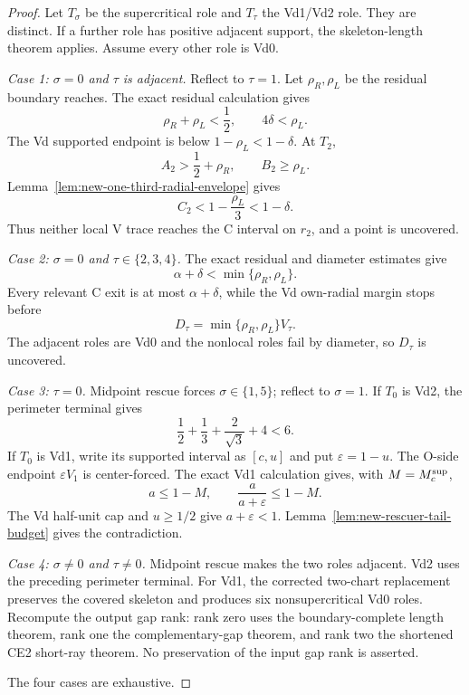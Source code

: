 

\begin{proof}
Let $T_\sigma$ be the supercritical role and $T_\tau$ the Vd1/Vd2 role.
They are distinct.  If a further role has positive adjacent support, the
skeleton-length theorem applies.  Assume every other role is Vd0.

\smallskip
\noindent\emph{Case 1: $\sigma=0$ and $\tau$ is adjacent.}
Reflect to $\tau=1$.  Let $\rho_R,\rho_L$ be the residual boundary reaches.
The exact residual calculation gives
\[
 \rho_R+\rho_L<\frac12,
 \qquad
 4\delta<\rho_L.
 \tag{6.45}
\]
The Vd supported endpoint is below $1-\rho_L<1-\delta$.  At $T_2$,
\[
 A_2>\frac12+\rho_R,\qquad B_2\ge\rho_L.
\]
Lemma~\ref{lem:new-one-third-radial-envelope} gives
\[
 C_2<
 1-\frac{\rho_L}{3}
 <1-\delta.
 \tag{6.46}
\]
Thus neither local V trace reaches the C interval on $r_2$, and a point is
uncovered.

\smallskip
\noindent\emph{Case 2: $\sigma=0$ and $\tau\in\{2,3,4\}$.}
The exact residual and diameter estimates give
\[
 \alpha+\delta<\min\{\rho_R,\rho_L\}.
 \tag{6.47}
\]
Every relevant C exit is at most $\alpha+\delta$, while the Vd own-radial
margin stops before
\[
 D_\tau=\min\{\rho_R,\rho_L\}V_\tau.
\]
The adjacent roles are Vd0 and the nonlocal roles fail by diameter, so
$D_\tau$ is uncovered.

\smallskip
\noindent\emph{Case 3: $\tau=0$.}
Midpoint rescue forces $\sigma\in\{1,5\}$; reflect to $\sigma=1$.
If $T_0$ is Vd2, the perimeter terminal gives
\[
 \frac12+\frac13+\frac2{\sqrt3}+4<6.
\]
If $T_0$ is Vd1, write its supported interval as $[c,u]$ and put
$\varepsilon=1-u$.  The O-side endpoint $\varepsilon V_1$ is center-forced.
The exact Vd1 calculation gives, with $M=M_c^{\rm sup}$,
\[
 a\le1-M,\qquad
 \frac{a}{a+\varepsilon}\le1-M.
 \tag{6.48}
\]
The Vd half-unit cap and $u\ge1/2$ give $a+\varepsilon<1$.
Lemma~\ref{lem:new-rescuer-tail-budget} gives the contradiction.

\smallskip
\noindent\emph{Case 4: $\sigma\ne0$ and $\tau\ne0$.}
Midpoint rescue makes the two roles adjacent.  Vd2 uses the preceding
perimeter terminal.  For Vd1, the corrected two-chart replacement preserves
the covered skeleton and produces six nonsupercritical Vd0 roles.  Recompute
the output gap rank: rank zero uses the boundary-complete length theorem,
rank one the complementary-gap theorem, and rank two the shortened CE2
short-ray theorem.  No preservation of the input gap rank is asserted.

The four cases are exhaustive.
\end{proof}
